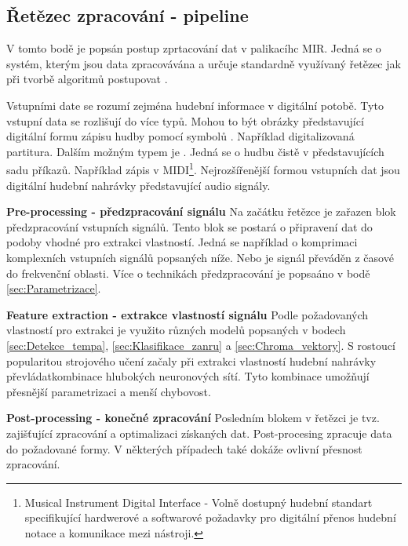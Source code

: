    \subsection{Řetězec zpracování - pipeline}

    V tomto bodě je popsán postup zprtacování dat v palikacíhc \acs{MIR}.
    Jedná se o systém, kterým jsou data zpracovávána a určuje standardně využívaný řetězec jak při tvorbě algoritmů postupovat .
    
    Vstupními date se rozumí zejména hudební informace v digitální potobě.
    Tyto vstupní data se rozlišují do více typů. Mohou to být obrázky představující digitální formu zápisu hudby pomocí symbolů \cite{a_new_companion_to_digital_humanities}.
    Například digitalizovaná partitura.
    Dalším možným typem je .
    Jedná se o hudbu čistě v  představujících sadu příkazů.
    Například zápis v \acs{MIDI}\footnote{Musical Instrument Digital Interface -
    Volně dostupný hudební standart specifikující hardwerové a softwarové požadavky pro digitální přenos hudební notace a komunikace mezi nástroji.\cite{wiki:MIDI}}.
    Nejrozšířenější formou vstupních dat jsou digitální hudební nahrávky představující audio signály.

    \textbf{Pre-processing - předzpracování signálu}
    Na začátku řetězce je zařazen blok předzpracování vstupních signálů.
    Tento blok se postará o připravení dat do podoby vhodné pro extrakci vlastností.
    Jedná se například o komprimaci komplexních vstupních signálů popsaných níže.
    Nebo je signál převáděn z časové do frekvenční oblasti.
    Více o technikách předzpracování je popsaáno v bodě \ref{sec:Parametrizace}.

    \textbf{Feature extraction - extrakce vlastností signálu}
    Podle požadovaných vlastností pro extrakci je využito různých modelů popsaných v bodech \ref{sec:Detekce_tempa}, \ref{sec:Klasifikace_zanru} a \ref{sec:Chroma_vektory}.
    S rostoucí popularitou strojového učení začaly při extrakci vlastností hudební nahrávky převládatkombinace hlubokých neuronových sítí.
    Tyto kombinace umožňují přesnější parametrizaci a menší chybovost.

    \textbf{Post-processing - konečné zpracování}
    Posledním blokem v řetězci je tvz.  zajišťující zpracování a optimalizaci získaných dat.
    Post-procesing zpracuje data do požadované formy. V některých případech také dokáže ovlivní přesnost zpracování.

